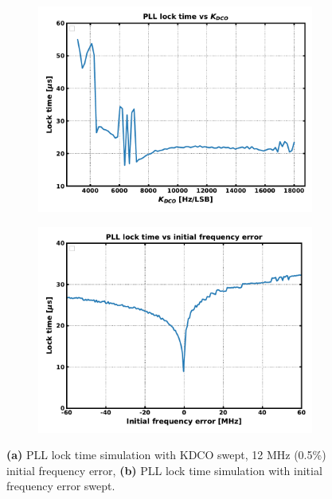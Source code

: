 	\begin{figure}[htb!]
	    \centering
	    \begin{subfigure}{0.5\textwidth}
	        \centering
	        \center\includegraphics[width=1.0\textwidth, angle=0]{figs/kdco_sweep.pdf}
	        \caption{ }
	        \label{fig:sweep_kdco}
	    \end{subfigure}%
	    \begin{subfigure}{0.5\textwidth}
	        \centering
	        \center\includegraphics[width=1.0\textwidth, angle=0]{figs/finit_sweep.pdf}
	        \caption{ }
	        \label{fig:sweep_finit}
	    \end{subfigure}
	    \label{fig:sweep_sim}
	    \caption{\textbf{(a)} PLL lock time simulation with KDCO swept, 12 MHz (0.5\%) initial frequency error, \textbf{(b)} PLL lock time simulation with initial frequency error swept.}
	\end{figure}

